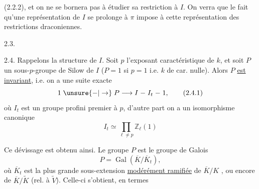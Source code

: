 (2.2.2), et on ne se bornera pas  à étudier sa restriction à \(I\).  On verra  que  le fait qu'une représentation de \(I\) se prolonge à \(\pi\) impose à cette représentation des restrictions draconiennes.

2.3.

2.4. Rappelons la structure de \(I\). Soit \(p\) l'exposant caractéristique de \(k\),  et soit \(P\)  un  sous-\(p\)-groupe de Silow de \(I\) (\(P=1\) si \(p=1\) i.e. \(k\) de car. nulle). Alors \(P\) \uline{est invariant}, i.e. on a une suite exacte
\[
1\mathrel{\unsure{-|\to}}P\longrightarrow I\mathrel{-} I_t\mathrel{-}1,\tag*{(2.4.1)}
\]
où \(I_t\)  est un groupe profini premier à \(p\), d'autre part on a un isomorphisme canonique
\[
I_t\simeq\prod_{\ell\ne p}\mathbb Z_\ell(1)\tag*{(2.4.2)}
\]

Ce dévissage est obtenu ainsi. Le groupe \(P\) est le groupe de Galois 
\[
P=\operatorname{Gal}(\overline K/\overline K_t),\tag*{(2.4.1)}
\]
où \(\overline K_t\) est la plus  grande sous-extension \uline{modérément ramifiée} de \(\overline K/K\) , ou encore de \(\overline K/\widetilde K\) (rel. à \(\widetilde V\)). Celle-ci s'obtient, en termes
